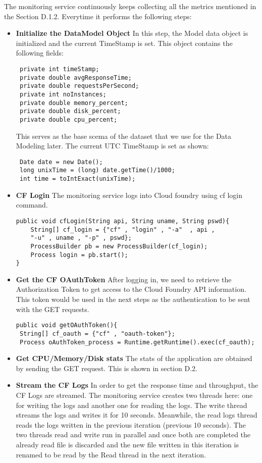 \documentclass[article,type=msc,colorback,12pt,accentcolor=tud7b,table]{tudthesis}
\begin{document}
	The monitoring service continuously keeps collecting all the metrics mentioned in the Section D.1.2. Everytime it performs the following steps:
	\begin{itemize}
		\item{\textbf{Initialize the DataModel Object}} In this step, the Model data object is initialized and the current TimeStamp is set. This object contains the following fields: 
\begin{lstlisting}
 private int timeStamp;
 private double avgResponseTime;
 private double requestsPerSecond;
 private int noInstances;
 private double memory_percent;
 private double disk_percent;
 private double cpu_percent;
\end{lstlisting}
This serves as the base scema of the dataset that we use for the Data Modeling later. The current UTC TimeStamp is set as shown: 
\begin{lstlisting}
 Date date = new Date();			   
 long unixTime = (long) date.getTime()/1000;
 int time = toIntExact(unixTime);
\end{lstlisting}

\item{\textbf{CF Login}} The monitoring service logs into Cloud foundry using cf login command.
\begin{lstlisting}
public void cfLogin(String api, String uname, String pswd){
	String[] cf_login = {"cf" , "login" , "-a"  , api , 
	"-u" , uname , "-p" , pswd};
	ProcessBuilder pb = new ProcessBuilder(cf_login);
	Process login = pb.start();
}
\end{lstlisting}
\item{\textbf{Get the CF OAuthToken}} After logging in, we need to retrieve the Authorization Token to get access to the Cloud Foundry API information. This token would be used in the next steps as the authentication to be sent with the GET requests.
\begin{lstlisting}
public void getOAuthToken(){				
 String[] cf_oauth = {"cf" , "oauth-token"};			
 Process oAuthToken_process = Runtime.getRuntime().exec(cf_oauth);
\end{lstlisting}
		
\item{\textbf{Get CPU/Memory/Disk stats}} 
The stats of the application are obtained by sending the GET request. This is shown in section D.2.
		
\item{\textbf{Stream the CF Logs}} In order to get the response time and throughput, the CF Logs are streamed. The monitoring service creates two threads here: one for writing the logs and another one for reading the logs. The write thread streams the logs and writes it for 10 seconds. Meanwhile, the read logs thread reads the logs written in the previous iteration (previous 10 seconds). The two threads read and write run in parallel and once both are completed the already read file is discarded and the new file written in this iteration is renamed to be read by the Read thread in the next iteration.


\end{itemize}
\end{document}
